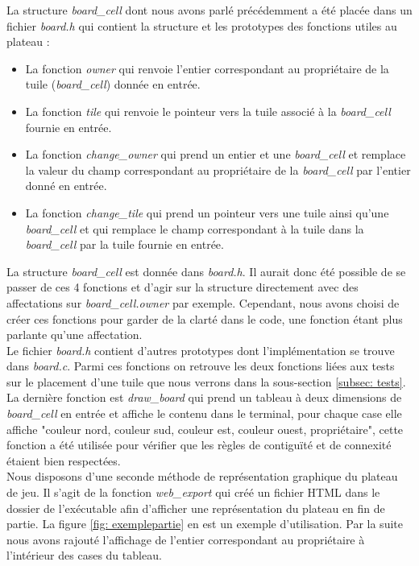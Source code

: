 \documentclass[11pt]{article}
\begin{document}
La structure \emph{board\_cell} dont nous avons parlé précédemment a été placée dans un fichier \emph{board.h} qui contient la structure et les prototypes des fonctions utiles au plateau :

\begin{itemize}
\item La fonction \emph{owner} qui renvoie l'entier correspondant au propriétaire de la tuile (\emph{board\_cell}) donnée en entrée.
\item La fonction \emph{tile} qui renvoie le pointeur vers la tuile associé à la \emph{board\_cell} fournie en entrée.
\item La fonction \emph{change\_owner} qui prend un entier et une \emph{board\_cell} et remplace la valeur du champ correspondant au propriétaire de la \emph{board\_cell} par l'entier donné en entrée.
\item La fonction \emph{change\_tile} qui prend un pointeur vers une tuile ainsi qu'une \emph{board\_cell} et qui remplace le champ correspondant à la tuile dans la \emph{board\_cell} par la tuile fournie en entrée. \\
\end{itemize}

La structure \emph{board\_cell} est donnée dans \emph{board.h}. Il aurait donc été possible de se passer de ces 4 fonctions et d'agir sur la structure directement avec des affectations sur \emph{board\_cell.owner} par exemple. Cependant, nous avons choisi de créer ces fonctions pour garder de la clarté dans le code, une fonction étant plus parlante qu'une affectation. \\

Le fichier \emph{board.h} contient d'autres prototypes dont l'implémentation se trouve dans \emph{board.c}. Parmi ces fonctions on retrouve les deux fonctions liées aux tests sur le placement d'une tuile que nous verrons dans la sous-section \ref{subsec: tests}. La dernière fonction est \emph{draw\_board} qui prend un tableau à deux dimensions de \emph{board\_cell} en entrée et affiche le contenu dans le terminal, pour chaque case elle affiche "couleur nord, couleur sud, couleur est, couleur ouest, propriétaire", cette fonction a été utilisée pour vérifier que les règles de contiguïté et de connexité étaient bien respectées. \\

Nous disposons d'une seconde méthode de représentation graphique du plateau de jeu. Il s'agit de la fonction \emph{web\_export} qui créé un fichier HTML dans le dossier de l'exécutable afin d'afficher une représentation du plateau en fin de partie. La figure \ref{fig: exemplepartie} en est un exemple d'utilisation. Par la suite nous avons rajouté l'affichage de l'entier correspondant au propriétaire à l'intérieur des cases du tableau.
\end{document}
